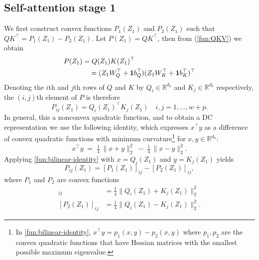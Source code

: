 \documentclass{ifacconf}
\begin{document}
\subsection{Self-attention stage 1}\label{sec:stage1}
We first construct convex functions \( P_1(Z_1)\) and \( P_2(Z_1)\) such that \(QK^\top = P_1(Z_1) - P_2(Z_1)\).
Let $P(Z_1) = Q K^\top$, then from (\ref{fun:QKV}) we obtain
\begin{align}
P(Z_1) 
&= 
Q(Z_1) K(Z_1)^\top \notag\\
&\quad = 
(Z_1W_Q^\top + \mathbf{1} b_Q^\top)(Z_1W_K^\top + \mathbf{1} b_K^\top )^\top 
\label{fun:PZ1} 
\end{align}
Denoting the $i$th and $j$th rows of $Q$ and $K$ by $Q_i\in\mathbb{R}^{d_k}$ and $K_j\in\mathbb{R}^{d_k}$ respectively, the $(i,j)$th element of $P$ is therefore
\begin{equation}
P_{ij}(Z_1) = Q_i(Z_1) ^\top K_j(Z_1)
\quad i,j = 1,\dots,w+p.
\label{eq:P-entry-inner-product}
\end{equation}
In general, this a nonconvex quadratic function,
and to obtain a DC representation we use the following identity, which expresses $x^\top y$ as a difference of convex quadratic functions with minimum curvature\footnote{In \eqref{fun:bilinear-identity}, $x^\top y = p_1(x,y) - p_2(x,y)$ where $p_1,p_2$ are the convex quadratic functions that have Hessian matrices with the smallest possible maximum eigenvalue.}
for $x,y \in \mathbb{R}^{d_k}$:
\begin{equation}
  x^\top y
  \;=\;
  \tfrac{1}{4}\,\bigl\|x + y\bigr\|_2^2
  \;-\;
  \tfrac{1}{4}\,\bigl\|x - y\bigr\|_2^2 .
  \label{fun:bilinear-identity}
\end{equation}
Applying \eqref{fun:bilinear-identity} with $x = Q_i(Z_1)$ and $y = K_j(Z_1)$ yields
\begin{equation}
P_{ij}(Z_1)  = [P_1(Z_1)]_{ij} - [P_2(Z_1)]_{ij},
\end{equation}
where $P_1$ and $P_2$ are convex functions
\begin{align*}
[P_1(Z_1)]_{ij} &= \tfrac{1}{4}\|Q_i(Z_1) + K_j(Z_1)\|_2^2
\\
[P_2(Z_1)]_{ij} &= \tfrac{1}{4}\|Q_i(Z_1) - K_j(Z_1)\|_2^2.
\end{align*}
\end{document}
